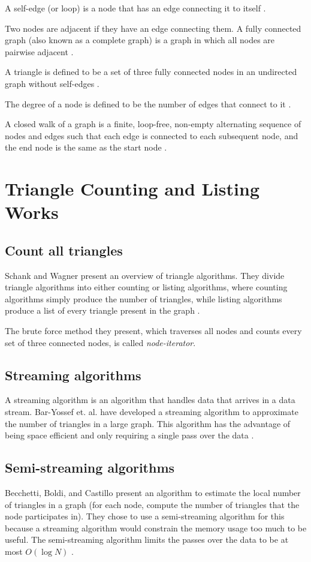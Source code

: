 \documentclass{acm_proc_article-sp}
\begin{document}
A self-edge (or loop) is a node that has an edge connecting it to itself
\cite{diestel}.

Two nodes are adjacent if they have an edge connecting them. A fully
connected graph (also known as a complete graph) is a graph in which all
nodes are pairwise adjacent \cite{diestel}.

A triangle is defined to be a set of three fully connected nodes in an
undirected graph without self-edges \cite{original}.

The degree of a node is defined to be the number of edges that connect to it
\cite{diestel}.

A closed walk of a graph is a finite, loop-free, non-empty alternating sequence
of nodes and edges such that each edge is connected to each subsequent node,
and the end node is the same as the start node \cite{diestel}.

\section{Triangle Counting and Listing Works}

\subsection{Count all triangles}
Schank and Wagner present an overview of triangle algorithms. They divide
triangle algorithms into either counting or listing algorithms, where counting
algorithms simply produce the number of triangles, while listing algorithms
produce a list of every triangle present in the graph \cite{schank}.

The brute force method they present, which traverses all nodes and counts every
set of three connected nodes, is called \textit{node-iterator}.

\subsection{Streaming algorithms}
A streaming algorithm is an algorithm that handles data that arrives in a
data stream. Bar-Yossef et. al. have developed a streaming algorithm to
approximate the number of triangles in a large graph. This algorithm has the
advantage of being space efficient and only requiring a single pass over the
data \cite{baryossef}. 

\subsection{Semi-streaming algorithms}
Becchetti, Boldi, and Castillo present an algorithm to estimate the local
number of triangles in a graph (for each node, compute the number of triangles
that the node participates in). They chose to use a semi-streaming algorithm
for this because a streaming algorithm would constrain the memory usage too
much to be useful. The semi-streaming algorithm limits the passes over the data
to be at most $O(\log N)$ \cite{becchetti}.
\end{document}
